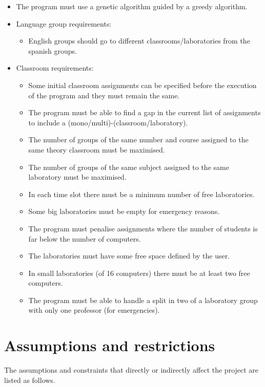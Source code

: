 \begin{itemize}
    \item The program must use a genetic algorithm guided by a greedy algorithm.
    \item Language group requirements:
        \begin{itemize}
            \item English groups should go to different classrooms/laboratories from the spanish groups.
        \end{itemize}
    \item Classroom requirements:
        \begin{itemize}
            \item Some initial classroom assignments can be specified before the execution of the program and they must remain the same.
            \item The program must be able to find a gap in the current list of assignments to include a (mono/multi)-(classroom/laboratory).
            \item The number of groups of the same number and course assigned to the same theory classroom must be maximised.
            \item The number of groups of the same subject assigned to the same laboratory must be maximised.
            \item In each time slot there must be a minimum number of free laboratories.
            \item Some big laboratories must be empty for emergency reasons.
            \item The program must penalise assignments where the number of students is far below the number of computers.
            \item The laboratories must have some free space defined by the user.
            \item In small laboratories (of 16 computers) there must be at least two free computers.
            \item The program must be able to handle a split in two of a laboratory group with only one professor (for emergencies).
        \end{itemize}
\end{itemize}

\section{Assumptions and restrictions}

The assumptions and constraints that directly or indirectly affect the project are listed as follows.

